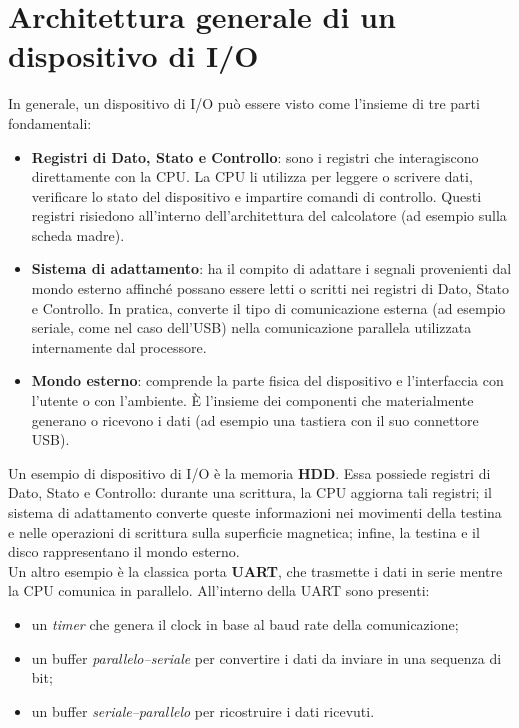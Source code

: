 \section{Architettura generale di un dispositivo di I/O}

In generale, un dispositivo di I/O può essere visto come l'insieme di tre parti fondamentali:

\begin{itemize}

    \item \textbf{Registri di Dato, Stato e Controllo}: sono i registri che interagiscono direttamente con la CPU. 
    La CPU li utilizza per leggere o scrivere dati, verificare lo stato del dispositivo e impartire comandi di controllo. 
    Questi registri risiedono all'interno dell'architettura del calcolatore (ad esempio sulla scheda madre).

    \item \textbf{Sistema di adattamento}: ha il compito di adattare i segnali provenienti dal mondo esterno affinché possano 
    essere letti o scritti nei registri di Dato, Stato e Controllo. In pratica, converte il tipo di comunicazione esterna 
    (ad esempio seriale, come nel caso dell'USB) nella comunicazione parallela utilizzata internamente dal processore.

    \item \textbf{Mondo esterno}: comprende la parte fisica del dispositivo e l'interfaccia con l'utente o con l'ambiente. 
    È l'insieme dei componenti che materialmente generano o ricevono i dati (ad esempio una tastiera con il suo connettore USB).

\end{itemize}

Un esempio di dispositivo di I/O è la memoria \textbf{HDD}. Essa possiede registri di Dato, Stato e Controllo: durante una 
scrittura, la CPU aggiorna tali registri; il sistema di adattamento converte queste informazioni nei movimenti della testina 
e nelle operazioni di scrittura sulla superficie magnetica; infine, la testina e il disco rappresentano il mondo esterno.
\\
Un altro esempio è la classica porta \textbf{UART}, che trasmette i dati in serie mentre la CPU comunica in parallelo. 
All'interno della UART sono presenti:
\begin{itemize}
    \item un \emph{timer} che genera il clock in base al baud rate della comunicazione;
    \item un buffer \emph{parallelo--seriale} per convertire i dati da inviare in una sequenza di bit;
    \item un buffer \emph{seriale--parallelo} per ricostruire i dati ricevuti.
\end{itemize}

